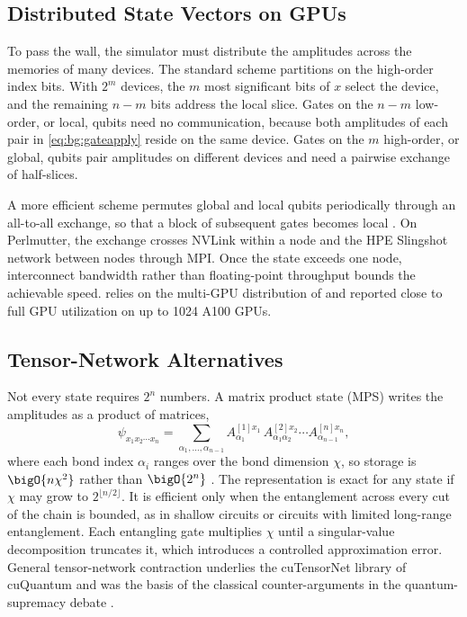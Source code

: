 \subsection{Distributed State Vectors on GPUs}

To pass the wall, the simulator must distribute the amplitudes across the memories of many devices. The standard scheme partitions on the high-order index bits. With $2^m$ devices, the $m$ most significant bits of $x$ select the device, and the remaining $n-m$ bits address the local slice. Gates on the $n-m$ low-order, or local, qubits need no communication, because both amplitudes of each pair in \cref{eq:bg:gateapply} reside on the same device. Gates on the $m$ high-order, or global, qubits pair amplitudes on different devices and need a pairwise exchange of half-slices.

A more efficient scheme permutes global and local qubits periodically through an all-to-all exchange, so that a block of subsequent gates becomes local \cite{bayraktar2023cuquantum}. On Perlmutter, the exchange crosses NVLink within a node and the HPE Slingshot network between nodes through MPI. Once the state exceeds one node, interconnect bandwidth rather than floating-point throughput bounds the achievable speed. \qgear{} \cite{guo2025qgear} relies on the multi-GPU distribution of \cudaq{} and reported close to full GPU utilization on up to 1024 A100 GPUs.

\subsection{Tensor-Network Alternatives}

Not every state requires $2^n$ numbers. A matrix product state (MPS) writes the amplitudes as a product of matrices,
\begin{equation}\label{eq:bg:mps}
\psi_{x_1x_2\cdots x_n}=\sum_{\alpha_1,\dots,\alpha_{n-1}}A^{[1]x_1}_{\alpha_1}\,A^{[2]x_2}_{\alpha_1\alpha_2}\cdots A^{[n]x_n}_{\alpha_{n-1}},
\end{equation}
where each bond index $\alpha_i$ ranges over the bond dimension $\chi$, so storage is $\bigO{n\chi^2}$ rather than $\bigO{2^n}$ \cite{perezgarcia2006mps}. The representation is exact for any state if $\chi$ may grow to $2^{\lfloor n/2\rfloor}$. It is efficient only when the entanglement across every cut of the chain is bounded, as in shallow circuits or circuits with limited long-range entanglement. Each entangling gate multiplies $\chi$ until a singular-value decomposition truncates it, which introduces a controlled approximation error. General tensor-network contraction underlies the cuTensorNet library of cuQuantum \cite{bayraktar2023cuquantum} and was the basis of the classical counter-arguments in the quantum-supremacy debate \cite{arute2019supremacy}.


